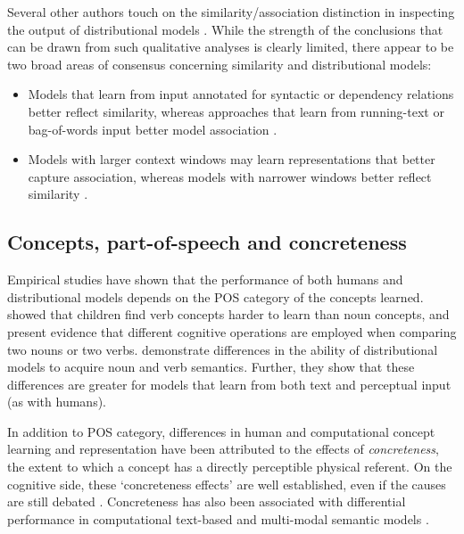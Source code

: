 \documentclass[fullname]{clv2}
\begin{document}
Several other authors touch on the similarity/association distinction in inspecting the output of distributional models \cite{andrews2009integrating,kiela2014systematic,levy2014dependency}. While the strength of the conclusions that can be drawn from such qualitative analyses is clearly limited, there appear to be two broad areas of consensus concerning similarity and distributional models: 

\begin{itemize}

\item Models that learn from input annotated for syntactic or dependency relations better reflect similarity, whereas approaches that learn from running-text or bag-of-words input better model association \cite{agirre2009study,levy2014dependency}. 

\item Models with larger context windows may learn representations that better capture association, whereas models with narrower windows better reflect similarity \cite{agirre2009study,kiela2014systematic}.

\end{itemize}







\subsection{Concepts, part-of-speech and concreteness}



Empirical studies have shown that the performance of both humans and distributional models depends on the POS category of the concepts learned.  showed that children find verb concepts harder to learn than noun concepts, and  present evidence that different cognitive operations are employed when comparing two nouns or two verbs.  demonstrate differences in the ability of distributional models to acquire noun and verb semantics. Further, they show that these differences are greater for models that learn from both text and perceptual input (as with humans).



In addition to POS category, differences in human and computational concept learning and representation have been attributed to the effects of \emph{concreteness}, the extent to which a concept has a directly perceptible physical referent. On the cognitive side, these `concreteness effects' are well established, even if the causes are still debated \cite{paivio1991dual,hill2013quantitative}. Concreteness has also been associated with differential performance in computational text-based \cite{hill2013concreteness} and multi-modal semantic models \cite{kielaimproving}.
\end{document}
